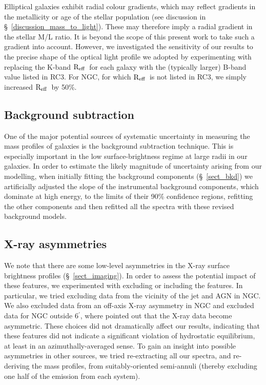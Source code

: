 \documentclass{emulateapj}
\def \arcmin {\hbox{$^\prime$}}
\newcommand{\reff}{${\rm R_{eff}}$}
\newcommand{\thin}{\thinspace}
\begin{document}
Elliptical galaxies exhibit radial colour gradients, which may reflect
gradients in the metallicity or age of the stellar population
(see discussion in \S~\ref{discussion_mass_to_light}). These
may therefore imply a radial gradient in the stellar M/L ratio.
It is beyond the scope of this present work to take such a gradient
into account. However, we investigated the sensitivity of 
our results to the precise shape of the optical light profile
we adopted by experimenting with replacing the K-band \reff\
for each galaxy with the (typically larger) B-band value listed in RC3.
For NGC\thin 6482, for which \reff\ is not listed in RC3, we simply
increased \reff\ by 50\%.


\subsection{Background subtraction} \label{sect_systematics_bkd}
One of the major potential sources of systematic uncertainty
in measuring the mass profiles of galaxies is the background 
subtraction technique. This is especially important in the
low surface-brightness regime at large radii in our galaxies. 
In order to 
estimate the likely magnitude of uncertainty arising from
our modelling, when initially fitting the background
components (\S~\ref{sect_bkd}) we artificially adjusted the 
slope of the instrumental background components, which dominate
at high energy, to the limits
of their 90\% confidence regions, refitting the other components
and then refitted all the spectra with these revised background
models.

\subsection{X-ray asymmetries} \label{sect_asymmetry}
We note that there are some low-level asymmetries in the X-ray 
surface brightness profiles (\S~\ref{sect_imaging}). In order to
assess the potential impact of these features, we experimented
with excluding or including the features. In particular, we 
tried
excluding data from the vicinity of the jet and  AGN in 
NGC\thin 4261. We also excluded data from an off-axis X-ray 
asymmetry in NGC\thin 4125 and excluded data for NGC\thin 4472 
outside 6\arcmin, where \citet{irwin96} pointed out that the 
X-ray data become asymmetric.
These choices did not dramatically affect our results, indicating
that these features did not indicate a significant
violation of hydrostatic equilibrium, at least in an 
azimuthally-averaged sense. 
To gain an insight into possible asymmetries in other sources, we 
tried re-extracting all our spectra, and re-deriving the mass
profiles, from suitably-oriented semi-annuli
(thereby excluding one half of the emission from each system).
\end{document}
